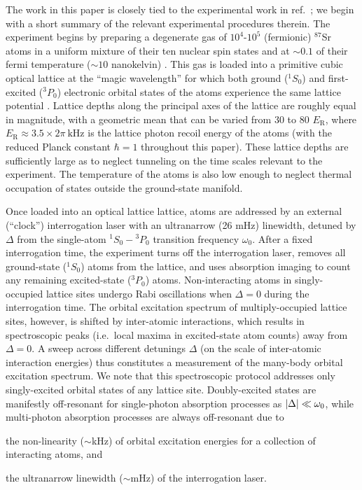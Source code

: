 \documentclass[preprint,showkeys,nofootinbib]{revtex4-1}
\renewcommand{\t}{\text} %
\newcommand{\1}{\mathds{1}}
\begin{document}
The work in this paper is closely tied to the experimental work in
ref.~\cite{goban2018emergence}; we begin with a short summary of the
relevant experimental procedures therein.  The experiment begins by
preparing a degenerate gas of $10^4$-$10^5$ (fermionic) ${}^{87}$Sr
atoms in a uniform mixture of their ten nuclear spin states and at
$\sim0.1$ of their fermi temperature ($\sim10$ nanokelvin)
\cite{campbell2017fermidegenerate, marti2018imaging}.  This gas is
loaded into a primitive cubic optical lattice at the ``magic
wavelength'' for which both ground (${}^1S_0$) and first-excited
(${}^3P_0$) electronic orbital states of the atoms experience the same
lattice potential \cite{ye2008quantum}.  Lattice depths along the
principal axes of the lattice are roughly equal in magnitude, with a
geometric mean that can be varied from 30 to 80 $E_{\t{R}}$, where
$E_{\t{R}}\approx3.5\times2\pi~\t{kHz}$ is the lattice photon recoil
energy of the atoms (with the reduced Planck constant $\hbar=1$
throughout this paper).  These lattice depths are sufficiently large
as to neglect tunneling on the time scales relevant to the experiment.
The temperature of the atoms is also low enough to neglect thermal
occupation of states outside the ground-state manifold.

Once loaded into an optical lattice lattice, atoms are addressed by an
external (``clock'') interrogation laser with an ultranarrow (26 mHz)
linewidth, detuned by $\Delta$ from the single-atom ${}^1S_0-{}^3P_0$
transition frequency $\omega_0$.  After a fixed interrogation time,
the experiment turns off the interrogation laser, removes all
ground-state (${}^1S_0$) atoms from the lattice, and uses absorption
imaging to count any remaining excited-state (${}^3P_0$) atoms.
Non-interacting atoms in singly-occupied lattice sites undergo Rabi
oscillations when $\Delta=0$ during the interrogation time.  The
orbital excitation spectrum of multiply-occupied lattice sites,
however, is shifted by inter-atomic interactions, which results in
spectroscopic peaks (i.e.~local maxima in excited-state atom counts)
away from $\Delta=0$.  A sweep across different detunings $\Delta$ (on
the scale of inter-atomic interaction energies) thus constitutes a
measurement of the many-body orbital excitation spectrum.  We note
that this spectroscopic protocol addresses only singly-excited orbital
states of any lattice site.  Doubly-excited states are manifestly
off-resonant for single-photon absorption processes as
$\abs{\Delta}\ll\omega_0$, while multi-photon absorption processes are
always off-resonant due to
\begin{enumerate*}
\item the non-linearity ($\sim$kHz) of orbital excitation energies for
  a collection of interacting atoms, and
\item the ultranarrow linewidth ($\sim$mHz) of the interrogation
  laser.
\end{enumerate*}
\end{document}
